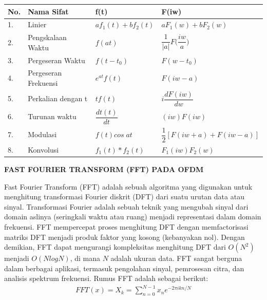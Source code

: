 \documentclass{article}
\begin{document}
\begin{table}[H]
    \renewcommand{\arraystretch}{2}
    \begin{center}
        \begin{tabular}{|l|l|l|l|}
            \hline
            \textbf{No.} & \textbf{Nama Sifat}  & \textbf{f(t)}       & \textbf{F(iw)}                           \\ \hline
            1.           & Linier               & $af_1(t) + bf_2(t)$ & $aF_1(w) + bF_2(w)$                      \\ \hline
            2.           & Pengskalaan Waktu    & $f(at)$             & $\dfrac{1}{|a|}F\Big(\dfrac{iw}{a}\Big)$ \\ \hline
            3.           & Pergeseran Waktu     & $f(t - t_0)$        & $F(w - t_0)$                             \\ \hline
            4.           & Pergeseran Frekuensi & $e^{at} f(t)$       & $F(iw - a)$                              \\ \hline
            5.           & Perkalian dengan t   & $t f(t)$            & $i\dfrac{d F(iw)}{dw}$                   \\ \hline
            6.           & Turunan waktu        & $\dfrac{dt(t)}{dt}$ & $(iw) F(iw)$                             \\ \hline
            7.           & Modulasi             & $f(t) cos\;at$      & $\dfrac{1}{2}[F(iw + a) + F(iw - a)]$    \\ \hline
            8.           & Konvolusi            & $f_1(t) * f_2(t)$   & $F_1(iw)F_2(w)$                          \\ \hline
        \end{tabular}
    \end{center}
\end{table}



\newpage
\begin{center}
    \textbf{FAST FOURIER TRANSFORM (FFT) PADA OFDM}
\end{center}
\leavevmode

Fast Fourier Transform (FFT) adalah sebuah algoritma yang digunakan untuk menghitung transformasi Fourier diskrit (DFT) dari suatu urutan data atau sinyal. Transformasi Fourier adalah sebuah teknik yang mengubah sinyal dari domain aslinya (seringkali waktu atau ruang) menjadi representasi dalam domain frekuensi. FFT mempercepat proses menghitung DFT dengan memfactorisasi matriks DFT menjadi produk faktor yang kosong (kebanyakan nol). Dengan demikian, FFT dapat mengurangi kompleksitas menghitung DFT dari $O(N^2)$ menjadi $O(N log N)$, di mana $N$ adalah ukuran data. FFT sangat berguna dalam berbagai aplikasi, termasuk pengolahan sinyal, pemrosesan citra, dan analisis spektrum frekuensi.
Rumus FFT adalah sebagai berikut:
\begin{align}
    \boxed{FFT(x) = X_k = \sum_{n=0}^{N-1} x_ne^{-2\pi ikn/N}}\nonumber
\end{align}
\end{document}
